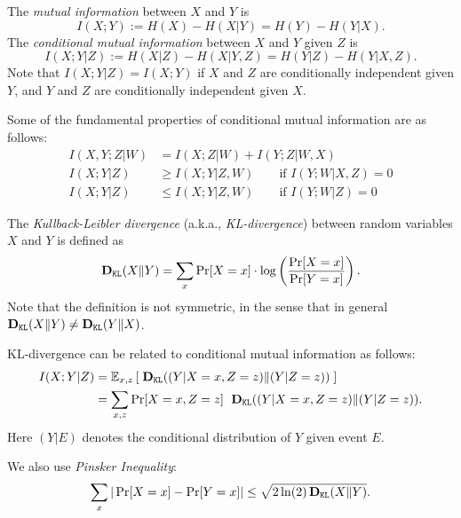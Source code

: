 The \emph{mutual information} between $X$ and $Y$ is
\[ I(X;Y) := H(X) - H(X|Y) = H(Y) - H(Y|X).\]
The \emph{conditional mutual information} between $X$ and $Y$ given $Z$ is
\[ I(X;Y|Z) := H(X|Z) - H(X|Y,Z) = H(Y|Z) - H(Y|X,Z).\]
Note that $I(X;Y|Z) = I(X;Y)$ if $X$ and $Z$ are conditionally independent given $Y$, and $Y$ and $Z$ are conditionally independent given $X$.

Some of the fundamental properties of conditional mutual information are as follows:
\begin{align}
I(X,Y;Z|W) &= I(X;Z|W) + I(Y;Z|W,X) \\
I(X;Y|Z) &\geq I(X;Y|Z,W) \qquad\text{if $I(Y;W|X,Z) = 0$} \\
I(X;Y|Z) &\leq I(X;Y|Z,W) \qquad\text{if $I(Y;W|Z) = 0$} 
\end{align}

The \emph{Kullback-Leibler divergence} (a.k.a., \emph{KL-divergence}) between random variables $X$ and $Y$ is defined as
\[ \textbf{D}_{\mathtt{KL}}(X\| Y) = \sum_x \Pr[X = x] 
    \cdot \log\left( \frac{\Pr[X = x]}{\Pr[Y = x]} \right) .\]
Note that the definition is not symmetric, in the sense that in general 
    $\textbf{D}_{\mathtt{KL}}(X\| Y)\neq \textbf{D}_{\mathtt{KL}}(Y\| X)$.

KL-divergence can be related to conditional mutual information as follows:
\begin{align}
I(X;Y|Z) 
    &= \mathbb{E}_{x,z}\left[ \; \textbf{D}_{\mathtt{KL}}((Y|X = x, Z=z)\|(Y|Z=z)) \; \right] \nonumber \\
    &= \sum_{x,z} \Pr[X=x,Z=z]\;\ \textbf{D}_{\mathtt{KL}}((Y|X = x, Z=z)\|(Y|Z=z)). 
\end{align}
Here $(Y|E)$ denotes the conditional distribution of $Y$ given event $E$.

We also use \emph{Pinsker Inequality}:
\begin{align}
\sum_x | \Pr[X=x] - \Pr[Y=x]| \leq \sqrt{2 \ln(2)\, \textbf{D}_{\mathtt{KL}}(X\|Y)}.
\end{align}

